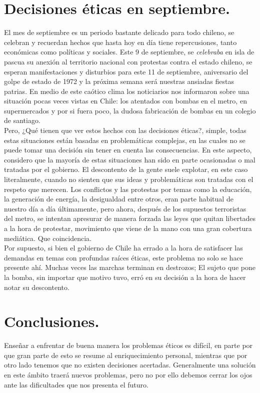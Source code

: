 \documentclass[spanish, fleqn]{article}
\begin{document}
	\newpage
	\section{Decisiones éticas en septiembre.}
	El mes de septiembre es un periodo bastante delicado para todo chileno, se 
	celebran y recuerdan hechos que hasta hoy en día tiene repercusiones, tanto
	económicas como políticas y sociales. Este 9 de septiembre, se 
	\emph{celebraba} en isla de pascua su anexión al territorio nacional con
	protestas contra el estado chileno\cite{r3}, se esperan manifestaciones y 
	disturbios para este 11 de septiembre, aniversario del golpe de estado de
	1972 y la próxima semana será nuestras ansiadas fiestas patrias. En medio 
	de este caótico clima los noticiarios nos informaron sobre una situación
	pocas veces vistas en Chile: los atentados con bombas en el metro\cite{r4},
	en supermercados\cite{r5} y por si fuera poco, la dudosa fabricación de 
	bombas en un colegio de santiago\cite{r6}.\\
	Pero, ¿Qué tienen que ver estos hechos con las decisiones éticas?, simple, 
	todas estas situaciones están basadas en problemáticas complejas, en las 
	cuales no se puede tomar una decisión sin tener en cuenta las consecuencias.
	En este aspecto, considero que la mayoría de estas situaciones han sido en 
	parte ocasionadas o mal tratadas por el gobierno. El descontento de la gente
	suele explotar, en este caso literalmente, cuando no sienten que sus ideas
	y problemáticas son tratadas con el respeto que merecen. Los conflictos y 
	las protestas por temas como la educación, la generación de energía, la 
	desigualdad entre otros, eran parte habitual de nuestro día a día 
	últimamente, pero ahora, después de los supuestos terroristas del metro, se
	intentan apresurar de manera forzada las leyes que quitan libertades a la
	hora de protestar, movimiento que viene de la mano con una gran cobertura
	mediática. Que coincidencia. \\
	Por supuesto, si bien el gobierno de Chile ha errado a la hora de satisfacer
	las demandas en temas con profundas raíces éticas, este problema no solo se
	hace presente ahí. Muchas veces las marchas terminan en destrozos; El sujeto
	que pone la bomba, sin importar que motivo tuvo, erró en su decisión a la 
	hora de hacer notar su descontento.

	\section{Conclusiones.}
	Enseñar a enfrentar de buena manera los problemas éticos es difícil, en 
	parte por que gran parte de esto se resume al enriquecimiento personal,
	mientras que por otro lado tenemos que no existen decisiones acertadas. 
	Generalmente una solución en este ámbito traerá nuevos problemas, pero no
	por ello debemos cerrar los ojos ante las dificultades que nos presenta el
	futuro.
\end{document}
